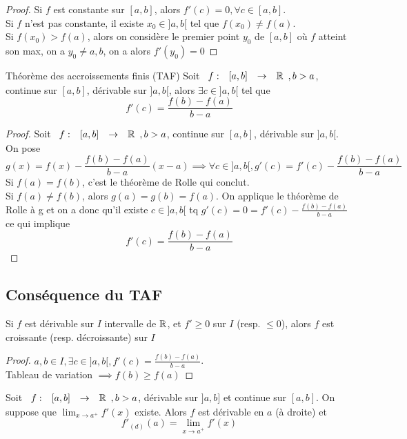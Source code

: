 \documentclass[]{report}
\begin{document}
\begin{proof}
    Si $f$ est constante sur $[a,b]$, alors $f'(c)=0,\forall c\in [a,b]$.\\
    Si $f$ n'est pas constante, il existe $x_0\in ]a,b[$ tel que $f(x_0)\neq f(a)$.\\
    Si $f(x_0)>f(a)$, alors on considère le premier point $y_0$ de $[a,b]$ où $f$ atteint son max, on a $y_0\neq a,b$, on a alors $f'(y_0)=0$
\end{proof}

\begin{tm}{Théorème des accroissements finis (TAF)}{}
    Soit $\begin{array}{ccccc} f : & [a,b] & \to & \mathbb{R} \end{array},b>a$, continue sur $[a,b]$, dérivable sur $]a,b[$, alors $\exists c\in ]a,b[$ tel que
    \[f'(c)=\frac{f(b)-f(a)}{b-a}\]
\end{tm}

\begin{proof}
    Soit $\begin{array}{ccccc} f : & [a,b] & \to & \mathbb{R} \end{array},b>a$, continue sur $[a,b]$, dérivable sur $]a,b[$. On pose
    \[g(x)=f(x) - \frac{f(b)-f(a)}{b-a}(x-a)\implies \forall c\in ]a,b[, g'(c)=f'(c)-\frac{f(b)-f(a)}{b-a}\]
    Si $f(a)=f(b)$, c'est le théorème de Rolle qui conclut.\\
    Si $f(a)\neq f(b)$, alors $g(a)= g(b) = f(a)$. On applique le théorème de Rolle à g et on a donc qu'il existe $c\in ]a,b[$ tq $g'(c)=0=f'(c)-\frac{f(b)-f(a)}{b-a}$ ce qui implique
    \[f'(c)=\frac{f(b)-f(a)}{b-a}\]
\end{proof}

\subsection*{Conséquence du TAF}

\begin{prop}{}{}
    Si $f$ est dérivable sur $I$ intervalle de $\mathbb{R}$, et $f'\ge 0$ sur $I$ (resp. $\le 0$), alors $f$ est croissante (resp. décroissante) sur $I$
\end{prop}

\begin{proof}
    $a,b\in I,\exists c\in ]a,b[, f'(c)=\frac{f(b)-f(a)}{b-a}$.\\
    Tableau de variation $\implies f(b)\ge f(a)$
\end{proof}

\begin{prop}{}{}
    Soit $\begin{array}{ccccc} f : & [a,b] & \to & \mathbb{R} \end{array}, b>a$, dérivable sur $]a,b]$ et continue sur $[a,b]$. On suppose que $\lim_{x\to a^+}f'(x)$ existe. Alors $f$ est dérivable en $a$ (à droite) et
    \[f'_{(d)}(a)=\lim_{x\to a^+} f'(x)\]
\end{prop}
\end{document}
